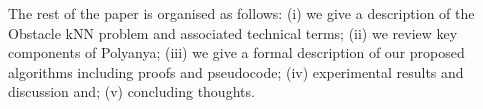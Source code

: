 The rest of the paper is organised as follows: (i) we give a description of the Obstacle kNN 
problem and associated technical terms; (ii) we review key components of
Polyanya; (iii) we give a formal description of our proposed algorithms including proofs and pseudocode;
(iv) experimental results and discussion and; (v) concluding thoughts.

